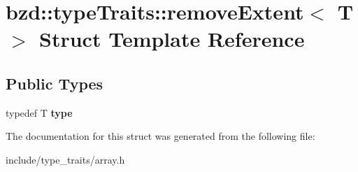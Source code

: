 \hypertarget{structbzd_1_1typeTraits_1_1removeExtent}{}\section{bzd\+:\+:type\+Traits\+:\+:remove\+Extent$<$ T $>$ Struct Template Reference}
\label{structbzd_1_1typeTraits_1_1removeExtent}
\subsection*{Public Types}
\begin{DoxyCompactItemize}
\item 
\mbox{\label{structbzd_1_1typeTraits_1_1removeExtent_a44e8090a707eac2e0e6b159c1e1bd737}} 
typedef T {\bfseries type}
\end{DoxyCompactItemize}


The documentation for this struct was generated from the following file\+:\begin{DoxyCompactItemize}
\item 
include/type\+\_\+traits/array.\+h\end{DoxyCompactItemize}
